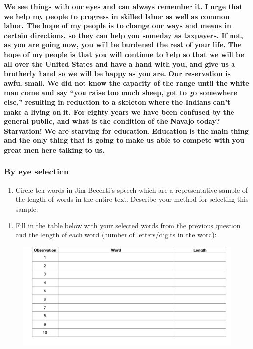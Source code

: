 \documentclass[
]{report}
\providecommand{\tightlist}{%
  \setlength{\itemsep}{0pt}\setlength{\parskip}{0pt}}
\begin{document}
\textbf{We see things with our eyes and can always remember it. I urge that we help my people to progress in skilled labor as well as common labor. The hope of my people is to change our ways and means in certain directions, so they can help you someday as taxpayers. If not, as you are going now, you will be burdened the rest of your life. The hope of my people is that you will continue to help so that we will be all over the United States and have a hand with you, and give us a brotherly hand so we will be happy as you are. Our reservation is awful small. We did not know the capacity of the range until the white man come and say ``you raise too much sheep, got to go somewhere else,'' resulting in reduction to a skeleton where the Indians can't make a living on it. For eighty years we have been confused by the general public, and what is the condition of the Navajo today? Starvation! We are starving for education. Education is the main thing and the only thing that is going to make us able to compete with you great men here talking to us.}

\hypertarget{by-eye-selection}{%
\subsubsection*{By eye selection}\label{by-eye-selection}}

\begin{enumerate}
\def\labelenumi{\arabic{enumi}.}
\setcounter{enumi}{4}
\tightlist
\item
  Circle ten words in Jim Becenti's speech which are a representative sample of the length of words in the entire text. Describe your method for selecting this sample.
\end{enumerate}

\vspace{0.3in}

\begin{enumerate}
\def\labelenumi{\arabic{enumi}.}
\setcounter{enumi}{5}
\tightlist
\item
  Fill in the table below with your selected words from the previous question and the length of each word (number of letters/digits in the word):
  \vspace{1mm}
\end{enumerate}

\begin{figure}

{\centering \includegraphics[width=0.65\linewidth]{images/word_length} 

}

\end{figure}
\end{document}
